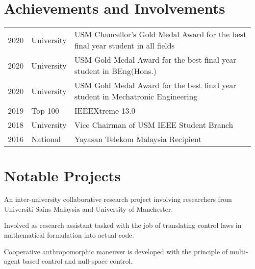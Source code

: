 \documentclass[letterpaper]{deedy-resume} %
\begin{document}
\begin{minipage}[t]{0.66\textwidth} %

\section{Achievements and Involvements} 

\begin{tabular}{rlp{}}
2020	 & University & USM Chancellor's Gold Medal Award for the best final year student in all fields\\
2020	 & University & USM Gold Medal Award for the best final year student in BEng(Hons.)\\
2020	 & University & USM Gold Medal Award for the best final year student in Mechatronic Engineering\\
2019	 & Top 100 & IEEEXtreme 13.0\\
2018 	 & University & Vice Chairman of USM IEEE Student Branch\\
2016	 & National & Yayasan Telekom Malaysia Recipient\\
\end{tabular}

\sectionspace

\section{Notable Projects}

\vspace{\topsep}
\begin{tightitemize}
\item An inter-university collaborative research project involving researchers from Universiti Sains Malaysia and University of Manchester.
\item Involved as research assistant tasked with the job of translating control laws in mathematical formulation into actual code.
\item Cooperative anthropomorphic maneuver is developed with the principle of multi-agent based control and null-space control.
\end{tightitemize} 
\sectionspace %


\end{minipage}
\end{document}
